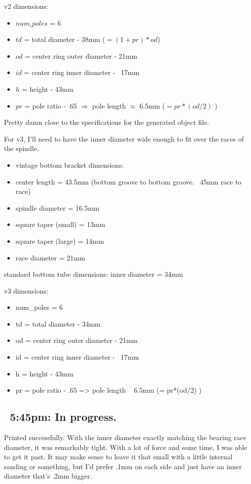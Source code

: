 \documentclass[11pt]{article} %
\begin{document}
v2 dimensions:
\begin{itemize}
\item $num\_poles$ = 6
\item $td$ = total diameter - 38mm ($=(1+pr)*od$)
\item $od$ = center ring outer diameter - 21mm
\item $id$ = center ring inner diameter - ~17mm
\item $h$ = height - 43mm
\item $pr$ = pole ratio - .65 $\Rightarrow$ pole length $\approx$ 6.5mm ($= pr*(od/2)$ )
\end{itemize}



Pretty damn close to the specifications for the generated object file.

For v3, I’ll need to have the inner diameter wide enough to fit over the races of the spindle.

\begin{itemize}
\item vintage bottom bracket dimensions:
\item center length = 43.5mm (bottom groove to bottom groove. ~45mm race to race)
\item spindle diameter = 16.5mm
\item square taper (small) = 13mm
\item square taper (large) = 14mm
\item race diameter = 21mm
\end{itemize}

standard bottom tube dimensions:
inner diameter = 34mm

v3 dimensions:
\begin{itemize}
\item num\_poles = 6
\item td = total diameter - 34mm
\item od = center ring outer diameter - 21mm
\item id = center ring inner diameter - ~17mm
\item h = height - 43mm
\item pr = pole ratio - .65 => pole length ~ 6.5mm (= pr*(od/2) )
\end{itemize}

\subsection*{~5:45pm: In progress.}

Printed successfully. With the inner diameter exactly matching the bearing race diameter, it was remarkably tight. With a lot of force and some time, I was able to get it past. It may make sense to leave it that small with a little internal sanding or something, but I’d prefer .1mm on each side and just have an inner diameter that’s .2mm bigger.
\end{document}
